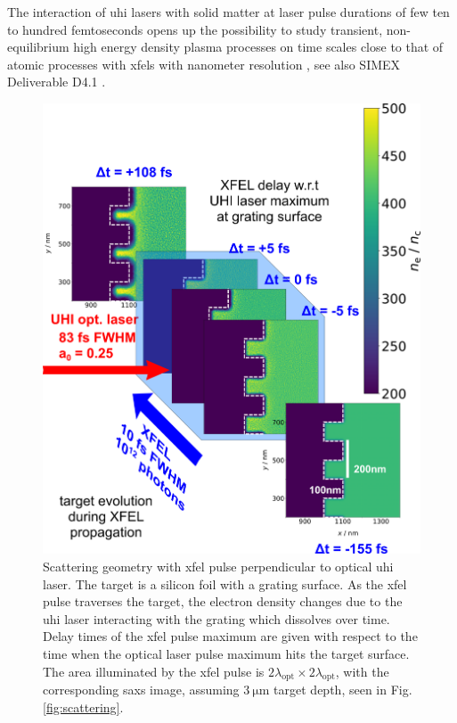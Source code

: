 The interaction of \gls{uhi} lasers with solid matter at laser
pulse durations of few ten to hundred femtoseconds opens up the possibility to
study transient, non-equilibrium high energy density plasma processes on time
scales close to that of atomic processes with \glspl{xfel} with
nanometer resolution \cite{Kluge2016}, see also SIMEX Deliverable D4.1
\cite{EUCALL_SIMEX_D4.1}.

\begin{figure}
\centering
  \includegraphics[width=.95\linewidth]{figures/scattering_geometry_v4.png}
\caption{
  Scattering geometry with \gls{xfel} pulse perpendicular to optical
  \gls{uhi} laser. The
target is a silicon foil with a grating surface. As the \gls{xfel} pulse traverses the
target, the electron density changes due to the \gls{uhi} laser interacting with the
grating which dissolves over time. Delay times of the \gls{xfel} pulse maximum are
given with respect to the time when the optical laser pulse maximum hits the
target surface.  The area illuminated by the \gls{xfel} pulse is
$2\lambda_\mathrm{opt} \times 2\lambda_\mathrm{opt}$, with the corresponding
\gls{saxs} image, assuming $\SI{3}{\micro\metre}$ target depth, seen in Fig.
\ref{fig:scattering}.  }
  \label{fig:density}
\end{figure}

